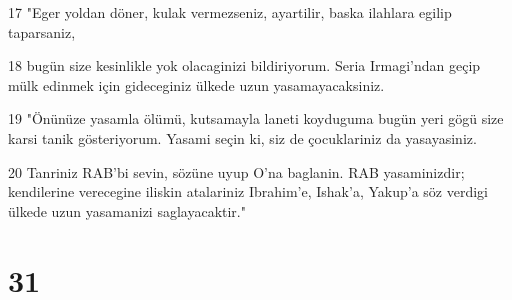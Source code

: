 \par 17 "Eger yoldan döner, kulak vermezseniz, ayartilir, baska ilahlara egilip taparsaniz,
\par 18 bugün size kesinlikle yok olacaginizi bildiriyorum. Seria Irmagi'ndan geçip mülk edinmek için gideceginiz ülkede uzun yasamayacaksiniz.
\par 19 "Önünüze yasamla ölümü, kutsamayla laneti koyduguma bugün yeri gögü size karsi tanik gösteriyorum. Yasami seçin ki, siz de çocuklariniz da yasayasiniz.
\par 20 Tanriniz RAB'bi sevin, sözüne uyup O'na baglanin. RAB yasaminizdir; kendilerine verecegine iliskin atalariniz Ibrahim'e, Ishak'a, Yakup'a söz verdigi ülkede uzun yasamanizi saglayacaktir."

\chapter{31}

